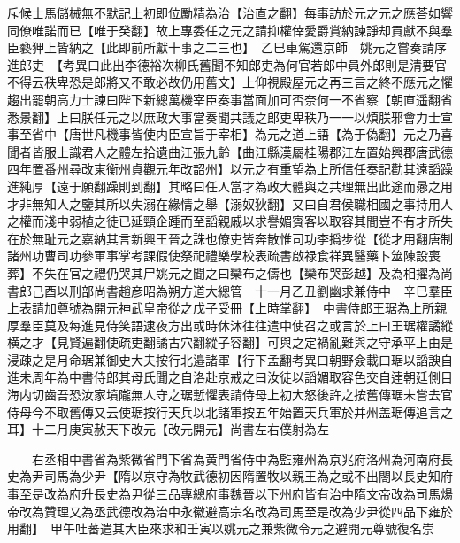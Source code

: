 斥候士馬儲械無不默記上初即位勵精為治【治直之翻】每事訪於元之元之應荅如響同僚唯諾而已【唯于癸翻】故上專委任之元之請抑權倖愛爵賞納諫諍却貢獻不與羣臣褻狎上皆納之【此即前所獻十事之二三也】　乙巳車駕還京師　姚元之嘗奏請序進郎吏　【考異曰此出李德裕次柳氏舊聞不知郎吏為何官若郎中員外郎則是清要官不得云秩卑恐是郎將又不敢必故仍用舊文】上仰視殿屋元之再三言之終不應元之懼趨出罷朝高力士諫曰陛下新總萬機宰臣奏事當面加可否奈何一不省察【朝直遥翻省悉景翻】上曰朕任元之以庶政大事當奏聞共議之郎吏卑秩乃一一以煩朕邪會力士宣事至省中【唐世凡機事皆使内臣宣旨于宰相】為元之道上語【為于偽翻】元之乃喜聞者皆服上識君人之體左拾遺曲江張九齡【曲江縣漢屬桂陽郡江左置始興郡唐武德四年置番州尋改東衡州貞觀元年改韶州】以元之有重望為上所信任奏記勸其遠謟躁進純厚【遠于願翻躁則到翻】其略曰任人當才為政大體與之共理無出此途而曏之用才非無知人之鑒其所以失溺在緣情之舉【溺奴狄翻】又曰自君侯職相國之事持用人之權而淺中弱植之徒已延頸企踵而至謟親戚以求譽媚賓客以取容其間豈不有才所失在於無耻元之嘉納其言新興王晉之誅也僚吏皆奔散惟司功李撝步從【從才用翻唐制諸州功曹司功參軍事掌考課假使祭祀禮樂學校表疏書啟禄食祥異醫藥卜筮陳設喪葬】不失在官之禮仍哭其尸姚元之聞之曰欒布之儔也【欒布哭彭越】及為相擢為尚書郎己酉以刑部尚書趙彦昭為朔方道大總管　十一月乙丑劉幽求兼侍中　辛巳羣臣上表請加尊號為開元神武皇帝從之戊子受冊【上時掌翻】　中書侍郎王琚為上所親厚羣臣莫及每進見侍笑語逮夜方出或時休沐往往遣中使召之或言於上曰王琚權譎縱横之才【見賢遍翻使疏吏翻譎古穴翻縱子容翻】可與之定禍亂難與之守承平上由是浸疎之是月命琚兼御史大夫按行北邉諸軍【行下孟翻考異曰朝野僉載曰琚以謟諛自進未周年為中書侍郎其母氏聞之自洛赴京戒之曰汝徒以謟媚取容色交自逹朝廷側目海内切齒吾恐汝家墳隴無人守之琚慙懼表請侍母上初大怒後許之按舊傳琚未嘗去官侍母今不取舊傳又云使琚按行天兵以北諸軍按五年始置天兵軍於并州盖琚傳追言之耳】十二月庚寅赦天下改元【改元開元】尚書左右僕射為左

　　右丞相中書省為紫微省門下省為黄門省侍中為監雍州為京兆府洛州為河南府長史為尹司馬為少尹【隋以京守為牧武德初因隋置牧以親王為之或不出閤以長史知府事至是改為府升長史為尹從三品專總府事魏晉以下州府皆有治中隋文帝改為司馬煬帝改為贊理又為丞武德改為治中永徽避高宗名改為司馬至是改為少尹從四品下雍於用翻】　甲午吐蕃遣其大臣來求和壬寅以姚元之兼紫微令元之避開元尊號復名崇

